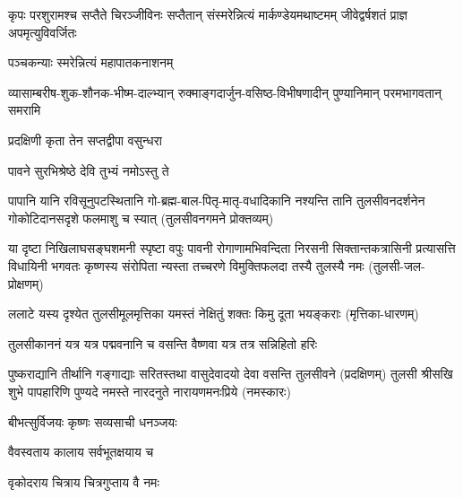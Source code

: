 
{कृपः परशुरामश्च सप्तैते चिरञ्जीविनः}
{सप्तैतान् संस्मरेन्नित्यं मार्कण्डेयमथाष्टमम्}
{जीवेद्वर्षशतं प्राज्ञ अपमृत्युविवर्जितः}

{पञ्चकन्याः स्मरेन्नित्यं महापातकनाशनम्}



{व्यासाम्बरीष-शुक-शौनक-भीष्म-दाल्भ्यान्}
{रुक्माङ्गदार्जुन-वसिष्ठ-विभीषणादीन्}
{पुण्यानिमान् परमभागवतान् समरामि}



{प्रदक्षिणी कृता तेन सप्तद्वीपा वसुन्धरा}

{पावने सुरभिश्रेष्ठे देवि तुभ्यं नमोऽस्तु ते}

\closesection

\fourlineindentedshloka
{पापानि यानि रविसूनुपटस्थितानि}
{गो-ब्रह्म-बाल-पितृ-मातृ-वधादिकानि}
{नश्यन्ति तानि तुलसीवनदर्शनेन}
{गोकोटिदानसदृशे फलमाशु च स्यात्}
{(तुलसीवनगमने प्रोक्तव्यम्)}

\fourlineindentedshloka
{या दृष्टा निखिलाघसङ्घशमनी स्पृष्टा वपुः पावनी}
{रोगाणामभिवन्दिता निरसनी सिक्तान्तकत्रासिनी}
{प्रत्यासत्ति विधायिनी भगवतः कृष्णस्य संरोपिता}
{न्यस्ता तच्चरणे विमुक्तिफलदा तस्यै तुलस्यै नमः}
(तुलसी-जल-प्रोक्षणम्)

\twolineshloka
{ललाटे यस्य दृश्येत तुलसीमूलमृत्तिका}
{यमस्तं नेक्षितुं शक्तः किमु दूता भयङ्कराः}
(मृत्तिका-धारणम्)

\twolineshloka
{तुलसीकाननं यत्र यत्र पद्मवनानि च}
{वसन्ति वैष्णवा यत्र तत्र सन्निहितो हरिः}

\twolineshloka
{पुष्कराद्यानि तीर्थानि गङ्गाद्याः सरितस्तथा}
{वासुदेवादयो देवा वसन्ति तुलसीवने}
(प्रदक्षिणम्)
\twolineshloka
{तुलसी श्रीसखि शुभे पापहारिणि पुण्यदे}
{नमस्ते नारदनुते नारायणमनःप्रिये}
 (नमस्कारः)

\closesection


{बीभत्सुर्विजयः कृष्णः सव्यसाची धनञ्जयः}
 
\closesection


{वैवस्वताय   कालाय   सर्वभूतक्षयाय   च}

{वृकोदराय   चित्राय   चित्रगुप्ताय   वै  नमः}
\closesection
